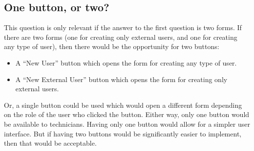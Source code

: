 \subsection{One button, or two?}

This question is only relevant if the answer to the first question is two forms.
If there are two forms (one for creating only external users, and one for creating 
any type of user), then there would be the opportunity for two buttons:
\begin{itemize}\itemsep1pt
    \item A ``New User'' button which opens the form for creating any type of user.
    \item A ``New External User'' button which opens the form for creating only 
    external users.
\end{itemize}
Or, a single button could be used which would open a different form depending on the
role of the user who clicked the button. Either way, only one button would be available 
to technicians. Having only one button would allow for a simpler user interface. But if 
having two buttons would be significantly easier to implement, then that would be 
acceptable.